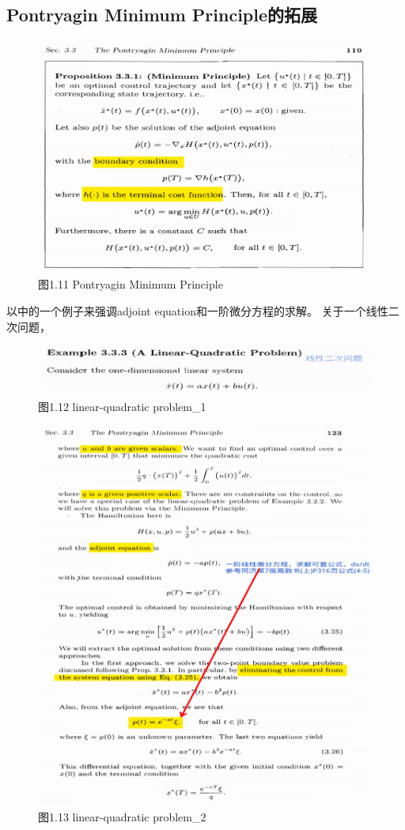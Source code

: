 \documentclass[40pt,a4paper,UTF8]{ctexart}
\numberwithin{equation}{section}
\begin{document}
\subsection{Pontryagin Minimum Principle的拓展}
\begin{figure}[H]
    \centering
    \includegraphics[width=4.8in]{ch4_12.png} {图1.11 Pontryagin Minimum Principle\cite{ref1}}
\end{figure}
以\cite{ref1}中的一个例子来强调adjoint equation和一阶微分方程的求解。
关于一个线性二次问题，
\begin{figure}[H]
    \centering
    \includegraphics[width=4.8in]{ch4_11.png} {图1.12 linear-quadratic problem\_1\cite{ref1}}
\end{figure}
\begin{figure}[H]
\centering
    \includegraphics[width=4.8in]{ch4_13.png} {图1.13 linear-quadratic problem\_2\cite{ref1}}
\end{figure}
\end{document}
